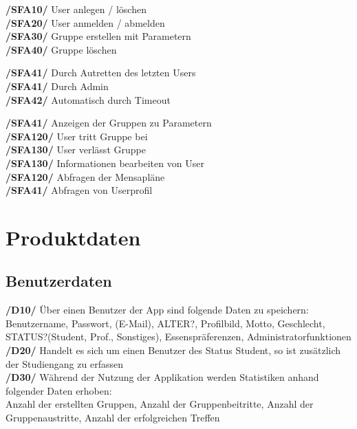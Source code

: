 \documentclass[a4paper]{scrreprt}
\begin{document}
\begin{addmargin}[25pt]{0pt} 
\textbf{/SFA10/} User anlegen / löschen\\
\textbf{/SFA20/} User anmelden / abmelden\\
\textbf{/SFA30/} Gruppe erstellen mit Parametern\\
\textbf{/SFA40/} Gruppe löschen\\
	\begin{addmargin}[25pt]{0pt} 
	\textbf{/SFA41/} Durch Autretten des letzten Users\\
	\textbf{/SFA41/} Durch Admin\\
	\textbf{/SFA42/} Automatisch durch Timeout\\
	\end{addmargin}
\textbf{/SFA41/} Anzeigen der Gruppen zu Parametern\\
\textbf{/SFA120/} User tritt Gruppe bei\\
\textbf{/SFA130/} User verlässt Gruppe\\
\textbf{/SFA130/} Informationen bearbeiten von User\\
\textbf{/SFA120/} Abfragen der Mensapläne\\
\textbf{/SFA41/} Abfragen von Userprofil\\
\end{addmargin}

\chapter{Produktdaten}

\section{Benutzerdaten}

\begin{addmargin}[25pt]{0pt}
\textbf{/D10/} Über einen Benutzer der App sind folgende Daten zu speichern:\\
Benutzername, Passwort, (E-Mail), ALTER?, Profilbild, Motto, Geschlecht, STATUS?(Student, Prof., Sonstiges), Essenspräferenzen, Administratorfunktionen\\
\textbf{/D20/} Handelt es sich um einen Benutzer des Status Student, so ist zusätzlich der Studiengang zu erfassen\\
\textbf{/D30/} Während der Nutzung der Applikation werden Statistiken anhand folgender Daten erhoben:\\
Anzahl der erstellten Gruppen, Anzahl der Gruppenbeitritte, Anzahl der Gruppenaustritte, Anzahl der erfolgreichen Treffen\\
\end{addmargin}
\end{document}
